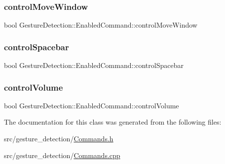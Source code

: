 \subsubsection{\texorpdfstring{control\+Move\+Window}{controlMoveWindow}}
{\footnotesize\ttfamily bool Gesture\+Detection\+::\+Enabled\+Command\+::control\+Move\+Window}

\mbox{\label{classGestureDetection_1_1EnabledCommand_abf2d47343a7abbcd43baa577861dd4b7}} 
\subsubsection{\texorpdfstring{control\+Spacebar}{controlSpacebar}}
{\footnotesize\ttfamily bool Gesture\+Detection\+::\+Enabled\+Command\+::control\+Spacebar}

\mbox{\label{classGestureDetection_1_1EnabledCommand_a8d2542571d224cdca24f428bc066215f}} 
\subsubsection{\texorpdfstring{control\+Volume}{controlVolume}}
{\footnotesize\ttfamily bool Gesture\+Detection\+::\+Enabled\+Command\+::control\+Volume}



The documentation for this class was generated from the following files\+:\begin{DoxyCompactItemize}
\item 
src/gesture\+\_\+detection/\hyperlink{Commands_8h}{Commands.\+h}\item 
src/gesture\+\_\+detection/\hyperlink{Commands_8cpp}{Commands.\+cpp}\end{DoxyCompactItemize}
